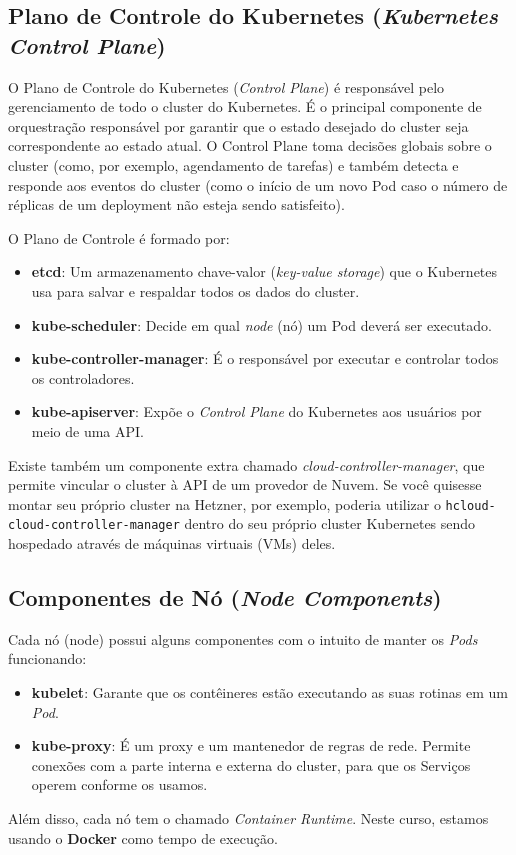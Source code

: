 \documentclass[11pt,a4paper]{article}
\begin{document}
\subsection*{\color{secondary}Plano de Controle do Kubernetes (\textit{Kubernetes Control Plane})}
O Plano de Controle do Kubernetes (\textit{Control Plane}) é responsável pelo gerenciamento de todo o cluster do Kubernetes. É o principal componente de orquestração responsável por garantir que o estado desejado do cluster seja correspondente ao estado atual. O Control Plane toma decisões globais sobre o cluster (como, por exemplo, agendamento de tarefas) e também detecta e responde aos eventos do cluster (como o início de um novo Pod caso o número de réplicas de um deployment não esteja sendo satisfeito).

O Plano de Controle é formado por:
\begin{itemize}
    \item \textbf{etcd}: Um armazenamento chave-valor (\textit{key-value storage}) que o Kubernetes usa para salvar e respaldar todos os dados do cluster.
    \item \textbf{kube-scheduler}: Decide em qual \textit{node} (nó) um Pod deverá ser executado.
    \item \textbf{kube-controller-manager}: É o responsável por executar e controlar todos os controladores.
    \item \textbf{kube-apiserver}: Expõe o \textit{Control Plane} do Kubernetes aos usuários por meio de uma API.
\end{itemize}

Existe também um componente extra chamado \textit{cloud-controller-manager}, que permite vincular o cluster à API de um provedor de Nuvem. Se você quisesse montar seu próprio cluster na Hetzner, por exemplo, poderia utilizar o \texttt{hcloud-cloud-controller-manager} dentro do seu próprio cluster Kubernetes sendo hospedado através de máquinas virtuais (VMs) deles.

\subsection*{\color{secondary}Componentes de Nó (\textit{Node Components})}
Cada nó (node) possui alguns componentes com o intuito de manter os \textit{Pods} funcionando:
\begin{itemize}
    \item \textbf{kubelet}: Garante que os contêineres estão executando as suas rotinas em um \textit{Pod}.
    \item \textbf{kube-proxy}: É um proxy e um mantenedor de regras de rede. Permite conexões com a parte interna e externa do cluster, para que os Serviços operem conforme os usamos.
\end{itemize}
Além disso, cada nó tem o chamado \textit{Container Runtime}. Neste curso, estamos usando o \textbf{Docker} como tempo de execução.
\end{document}
